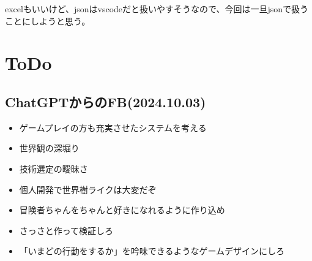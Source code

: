 \documentclass{mynote}
\begin{document}
excelもいいけど、jsonはvscodeだと扱いやすそうなので、今回は一旦jsonで扱うことにしようと思う。

\section{ToDo}
\subsection{ChatGPTからのFB(2024.10.03)}
\begin{itemize}
  \item ゲームプレイの方も充実させたシステムを考える
  \item 世界観の深堀り
  \item 技術選定の曖昧さ
  \item 個人開発で世界樹ライクは大変だぞ
  \item 冒険者ちゃんをちゃんと好きになれるように作り込め
  \item さっさと作って検証しろ
  \item 「いまどの行動をするか」を吟味できるようなゲームデザインにしろ
\end{itemize}
\end{document}
